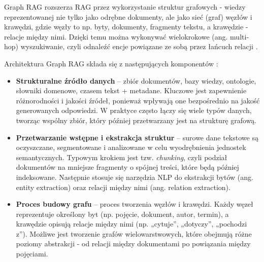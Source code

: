 \documentclass[
a4paper,
12pt,
]{article}
\newcounter{subsubsubsection}[subsubsection]
\begin{document}

Graph RAG rozszerza RAG przez wykorzystanie struktur grafowych - wiedzy reprezentowanej nie tylko jako odrębne dokumenty, ale jako sieć (graf) węzłów i krawędzi, gdzie węzły to np. byty, dokumenty, fragmenty tekstu, a krawędzie - relacje między nimi. Dzięki temu można wykonywać wielokrokowe (ang. multi-hop) wyszukiwanie, czyli odnaleźć encje powiązane ze sobą przez łańcuch relacji \cite{graphRAG}.


Architektura Graph RAG składa się z następujących komponentów \cite{graphRAG}: 
\begin{itemize}
    \item \textbf{Strukturalne źródło danych} -- zbiór dokumentów, bazy wiedzy, ontologie, słowniki domenowe, czasem tekst + metadane. Kluczowe jest zapewnienie różnorodności i jakości źródeł, ponieważ wpływają one bezpośrednio na jakość generowanych odpowiedzi. W praktyce często łączy się wiele typów danych, tworząc wspólny zbiór, który później przetwarzany jest na strukturę grafową. 
    \item \textbf{Przetwarzanie wstępne i ekstrakcja struktur} -- surowe dane tekstowe są oczyszczane, segmentowane i analizowane w celu wyodrębnienia jednostek semantycznych. Typowym krokiem jest tzw. \textit{chunking}, czyli podział dokumentów na mniejsze fragmenty o spójnej treści, które będą później indeksowane. Następnie stosuje się narzędzia NLP do ekstrakcji bytów (ang. entity extraction) oraz relacji między nimi (ang. relation extraction).
    \item \textbf{Proces budowy grafu} -- proces tworzenia węzłów i krawędzi. Każdy węzeł reprezentuje określony byt (np. pojęcie, dokument, autor, termin), a krawędzie opisują relacje między nimi (np. „cytuje”, „dotyczy”, „pochodzi z”). Możliwe jest tworzenie grafów wielowarstwowych, które obejmują różne poziomy abstrakcji - od relacji między dokumentami po powiązania między pojęciami. 

\end{itemize}
\end{document}
